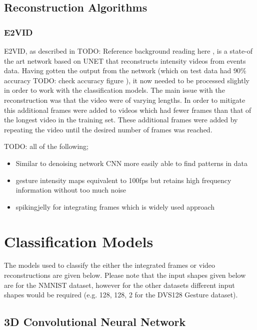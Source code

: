 \subsection{Reconstruction Algorithms}

\subsubsection{E2VID}

E2VID, as described in \color{red} TODO: Reference background reading here \color{black}, is a state-of the art network based on UNET that reconstructs intensity videos from events data. Having gotten the output from the network (which on test data had 90\% accuracy \color{red} TODO: check accuracy figure \color{black}), it now needed to be processed slightly in order to work with the classification models. The main issue with the reconstruction was that the video were of varying lengths. In order to mitigate this additional frames were added to videos which had fewer frames than that of the longest video in the training set. These additional frames were added by repeating the video until the desired number of frames was reached.

\color{red} TODO: all of the following;

\begin{itemize}
    \item Similar to denoising network CNN more easily able to find patterns in data
    \item gesture intensity maps equivalent to 100fps but retains high frequency information without too much noise
    \item spikingjelly for integrating frames which is widely used approach
\end{itemize}

\color{black}

\section{Classification Models}

The models used to classify the either the integrated frames or video reconstructions are given below. Please note that the input shapes given below are for the NMNIST dataset, however for the other datasets different input shapes would be required (e.g. {128, 128, 2} for the DVS128 Gesture dataset).

\subsection{3D Convolutional Neural Network}

